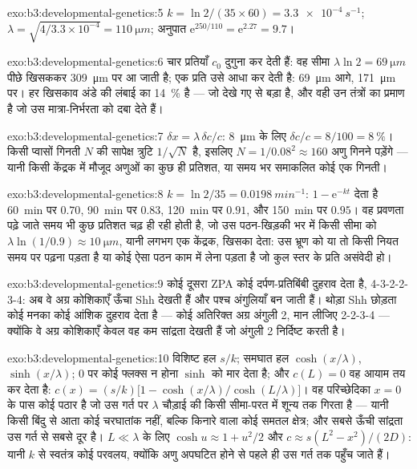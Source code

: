 \begin{solution}{exo:b3:developmental-genetics:5}
$k = \ln 2/(35\times 60) = \qty{3.3e-4}{s^{-1}}$; $\lambda = \sqrt{4/
3.3\times 10^{-4}} = \qty{110}{\micro m}$; अनुपात $\mathrm{e}^{250/110}
= \mathrm{e}^{2.27} = 9.7$।
\end{solution}

\begin{solution}{exo:b3:developmental-genetics:6}
चार प्रतियाँ $c_{0}$ दुगुना कर देती हैं: वह सीमा $\lambda\ln 2 =
\qty{69}{\micro m}$ पीछे खिसककर \qty{309}{\micro m} पर आ जाती है; एक
प्रति उसे आधा कर देती है: \qty{69}{\micro m} आगे, \qty{171}{\micro m}
पर। हर खिसकाव अंडे की लंबाई का \qty{14}{\%} है --- जो देखे गए से बड़ा
है, और वही उन तंत्रों का प्रमाण है जो उस मात्रा-निर्भरता को दबा देते
हैं।
\end{solution}

\begin{solution}{exo:b3:developmental-genetics:7}
$\delta x = \lambda\,\delta c/c$: \qty{8}{\micro m} के लिए $\delta c/c =
8/100 = \qty{8}{\%}$। किसी प्वासों गिनती $N$ की सापेक्ष
त्रुटि $1/\sqrt{N}$ है, इसलिए $N = 1/0.08^{2} \approx 160$ अणु गिनने
पड़ेंगे --- यानी किसी केंद्रक में मौजूद अणुओं का कुछ ही प्रतिशत, या
समय भर समाकलित कोई एक गिनती।
\end{solution}

\begin{solution}{exo:b3:developmental-genetics:8}
$k = \ln 2/35 = \qty{0.0198}{min^{-1}}$: $1 - \mathrm{e}^{-kt}$ देता है
\qty{60}{min} पर $0.70$, \qty{90}{min} पर $0.83$, \qty{120}{min} पर
$0.91$, और \qty{150}{min} पर $0.95$। वह प्रवणता पढ़े जाते समय भी कुछ
प्रतिशत चढ़ ही रही होती है, जो उस पठन-खिड़की भर में किसी सीमा को
$\lambda\ln(1/0.9) \approx \qty{10}{\micro m}$, यानी लगभग एक केंद्रक,
खिसका देता: उस भ्रूण को या तो किसी नियत समय पर पढ़ना पड़ता है या कोई
ऐसा पठन काम में लेना पड़ता है जो कुल स्तर के प्रति असंवेदी हो।
\end{solution}

\begin{solution}{exo:b3:developmental-genetics:9}
कोई दूसरा ZPA कोई दर्पण-प्रतिबिंबी दुहराव देता है, 4-3-2-2-3-4: अब वे
अग्र कोशिकाएँ ऊँचा Shh देखती हैं और पश्च अंगुलियाँ बन जाती हैं। थोड़ा
Shh छोड़ता कोई मनका कोई आंशिक दुहराव देता है --- कोई अतिरिक्त अग्र
अंगुली 2, मान लीजिए 2-2-3-4 --- क्योंकि वे अग्र कोशिकाएँ केवल वह कम
सांद्रता देखती हैं जो अंगुली 2 निर्दिष्ट करती है।
\end{solution}

\begin{solution}{exo:b3:developmental-genetics:10}
विशिष्ट हल $s/k$; समघात हल $\cosh(x/\lambda)$,
$\sinh(x/\lambda)$; $0$ पर कोई फ्लक्स न होना $\sinh$ को मार देता है;
और $c(L) = 0$ वह आयाम तय कर देता है:
$c(x) = (s/k)\bigl[1 - \cosh(x/\lambda)/\cosh(L/\lambda)\bigr]$।
वह परिच्छेदिका $x = 0$ के पास कोई पठार है जो उस गर्त पर $\lambda$
चौड़ाई की किसी सीमा-परत में शून्य तक गिरता है --- यानी किसी बिंदु से
आता कोई चरघातांक नहीं, बल्कि किनारे वाला कोई समतल क्षेत्र; और सबसे ऊँची
सांद्रता उस गर्त से सबसे दूर है। $L \ll \lambda$ के लिए $\cosh u \approx 1 +
u^{2}/2$ और $c \approx s(L^{2} - x^{2})/(2D)$: यानी $k$ से स्वतंत्र
कोई परवलय, क्योंकि अणु अपघटित होने से पहले ही उस गर्त तक पहुँच जाते हैं।
\end{solution}

